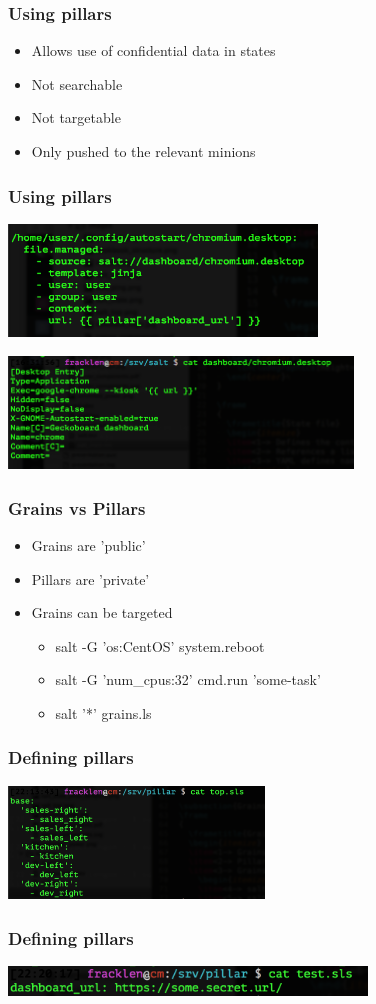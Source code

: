 \frame
{
  \frametitle{Using pillars}
  \begin{itemize}
  \item<1-> Allows use of confidential data in states
  \item<2-> Not searchable
  \item<3-> Not targetable
  \item<4-> Only pushed to the relevant minions
  \end{itemize}
}

\frame
{
  \frametitle{Using pillars}

  \begin{center}%
    \includegraphics[height=3cm]{images/salt_state_pillar.png}
  \end{center}%

  \begin{center}%
    \includegraphics[height=3cm]{images/salt_state_pillar_template.png}
  \end{center}%
}

\frame
{
  \frametitle{Grains vs Pillars}
  \begin{itemize}
  \item<1-> Grains are 'public'
  \item<2-> Pillars are 'private'
  \item<3-> Grains can be targeted
    \begin{itemize}
    \item<4-> salt -G 'os:CentOS' system.reboot
    \item<5-> salt -G 'num\_cpus:32' cmd.run 'some-task'
    \item<6-> salt '*' grains.ls
    \end{itemize}
  \end{itemize}
}

\frame
{
  \frametitle{Defining pillars}

  \begin{center}%
    \includegraphics[height=3cm]{images/salt_pillars_top.png}
  \end{center}%
}

\frame
{
  \frametitle{Defining pillars}

  \begin{center}%
    \includegraphics[height=0.8cm]{images/salt_pillars_def.png}
  \end{center}%
}

